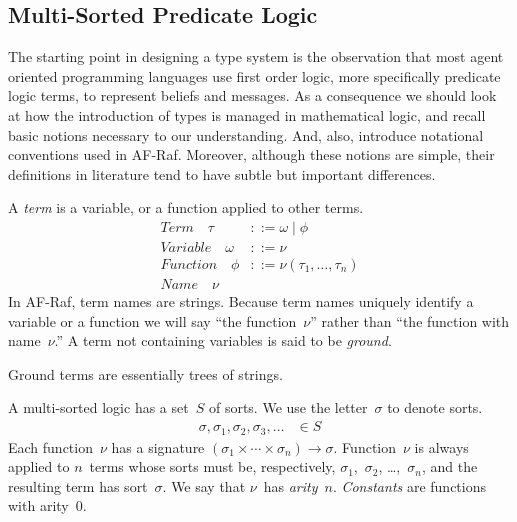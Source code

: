 \documentclass[a4paper,12pt,oneside,fleqn]{book} %
\begin{document}
\subsection{Multi-Sorted Predicate Logic} \label{sec:multi-sorted} %

The starting point in designing a type system is the observation that most
agent oriented programming languages use first order logic, more
specifically predicate logic terms, to represent beliefs and messages. As a
consequence we should look at how the introduction of types is managed in
mathematical logic, and recall basic notions necessary to our
understanding. And, also, introduce notational conventions used in AF-Raf.
Moreover, although these notions are simple, their definitions in
literature tend to have subtle but important differences.

A \emph{term} is a variable, or a function applied to other terms.
\begin{align}
\mathit{Term}\quad\tau &::= \omega \mid \phi \\
\mathit{Variable}\quad\omega &::= \nu \\
\mathit{Function}\quad\phi &::= \nu(\tau_1,\ldots,\tau_n) \\
\mathit{Name}\quad\nu
\end{align}
In AF-Raf, term names are strings.  Because term names uniquely identify a
variable or a function we will say ``the function~$\nu$'' rather than ``the
function with name~$\nu$.'' A term not containing variables is said to be
\emph{ground}.

\begin{remark}
Ground terms are essentially trees of strings.
\end{remark}

A multi-sorted logic has a set~$S$ of sorts.  We use the letter~$\sigma$ to
denote sorts.
\begin{align}
\sigma, \sigma_1, \sigma_2, \sigma_3, \ldots &\in S
\end{align}
Each function~$\nu$ has a signature
$(\sigma_1\times\cdots\times\sigma_n)\to\sigma$.  Function~$\nu$ is always
applied to $n$~terms whose sorts must be, respectively,
$\sigma_1$,~$\sigma_2$, \dots,~$\sigma_n$, and the resulting term has
sort~$\sigma$. We say that $\nu$~has \emph{arity}~$n$. \emph{Constants} are
functions with arity~$0$.
\end{document}
